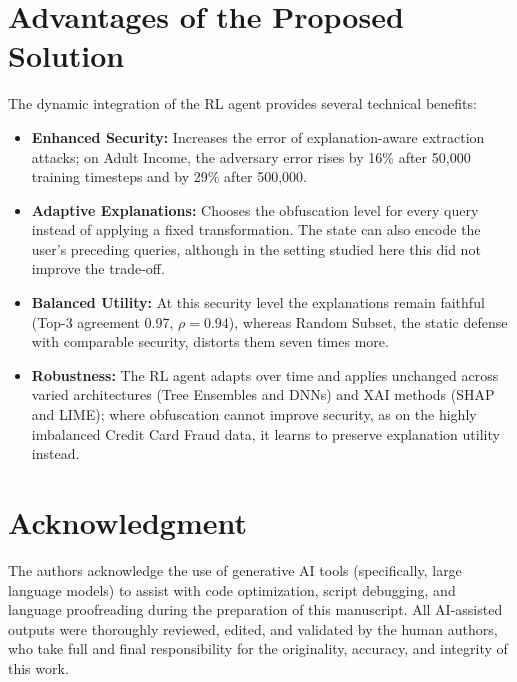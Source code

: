 \documentclass[conference]{IEEEtran}
\DeclareRobustCommand{\rev}[1]{#1}
\DeclareRobustCommand{\revnew}[1]{#1}
\begin{document}
\section{Advantages of the Proposed Solution}
The dynamic integration of the RL agent provides several technical benefits:
\begin{itemize}
    \item \textbf{Enhanced Security:} \revnew{Increases the error of explanation-aware extraction attacks; on Adult Income, the adversary error rises by 16\% after 50,000 training timesteps and by 29\% after 500,000.}
    \item \textbf{Adaptive Explanations:} \revnew{Chooses the obfuscation level for every query instead of applying a fixed transformation. The state can also encode the user's preceding queries, although in the setting studied here this did not improve the trade-off.}
    \item \textbf{Balanced Utility:} \revnew{At this security level the explanations remain faithful (Top-3 agreement 0.97, $\rho=0.94$), whereas Random Subset, the static defense with comparable security, distorts them seven times more.}
    \item \textbf{Robustness:} The RL agent adapts over time \rev{and applies unchanged} across varied architectures (Tree Ensembles and DNNs) and XAI methods (SHAP and LIME)\rev{; where obfuscation cannot improve security, as on the highly imbalanced Credit Card Fraud data, it learns to preserve explanation utility instead}.
\end{itemize}

\section*{Acknowledgment}
The authors acknowledge the use of generative AI tools (specifically, large language models) to assist with code optimization, script debugging, and language proofreading during the preparation of this manuscript. All AI-assisted outputs were thoroughly reviewed, edited, and validated by the human authors, who take full and final responsibility for the originality, accuracy, and integrity of this work.






\end{document}
